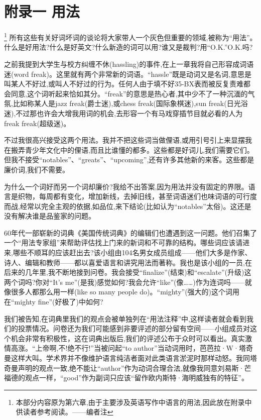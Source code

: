 \chapter{附录一 用法}\footnote{本部分内容原为第六章,由于主要涉及英语写作中语言的用法,因此放在附录中供读者参考阅读。——编者注}
所有这些有关好词坏词的谈论将大家带人一个灰色但重要的领域,被称为“用法”。什么是好用法?什么是好英文?什么新造的词可以用?谁又是裁判?用“O.K.”O.K.吗?

之前我提到大学生与校方纠缠不休(hassling)的事件,在上一章我将自己形容成词语迷(word freak)。这里就有两个非常新的词语。“hassle”既是动词又是名词,意思是叫某人不好过,或叫人不好过的行为。任何人由于填不好35-BX表而被反复责难都会同意,这个词听起来恰如其分。“freak”的意思是热心者,其中少不了一种沉湎的气氛,比如称某人是jazz freak(爵士迷),或chess freak(国际象棋迷),sun freak(日光浴迷),不过那也许会大增我用词的机会,去形容一个有马戏穿插节目就必看的人为freak freak(超级迷)。

不过我很高兴接受这两个用法。我并不把这些词当做俚语,或用引号引上来显摆我在搬弄青少年文化中的俚语,而且比谁懂的都多。这些都是好词儿,我们需要它们。但我不接受“notables”、“greats”、“upcoming”,还有许多其他新的来客。这些都是廉价词,我们不需要。

为什么一个词好而另一个词却廉价?我给不出答案,因为用法并没有固定的界限。语言是织物，每周都有变化，增加新线，去掉旧线，甚至词语迷们也味词语的可行度而战,经常以完全主观的依据,如品位,来下结论(比如认为“notables”太俗)。这还是没有解决谁是品鉴家的问题。

60年代一部崭新的词典《美国传统词典》的编辑们也遭遇到这一问题。他们召集了一个“用法专家组”来帮助评估找上门来的新词和不可靠的结构。哪些词应该请进来,哪些不顺耳的应该赶出去?该小组由104名男女成员组成——他们大多是作家、诗人、编辑和教师——都以喜爱语言和讲究用法而著称。我也是该小组的一员,在后来的几年里,我不断地接到问卷。我会接受“finalize”(结束)和“escalate”(升级)这两个词吗?你对“It’s me”(是我)感觉如何?我会允许“like”(像……)作为连词吗——就像很多人都那么用一样(like so many people do)。“mighty”(强大的)这个词用在“mighty fine”(好极了)中如何?

我们被告知,在词典里我们的观点会被单独列在“用法注释”中,这样读者就会看到我们的投票情况。问卷还为我们可能感到非要评述的部分留有空间——小组成员对这个机会非常有积极性，这在词典出版后,我们的评述公布于众时可以看出。真实激情高涨。“上帝啊,不!绝不行!”当被问起“to author”当动词用时，芭芭拉·W·塔奇曼这样大叫。学术界并不像维护语言纯洁者面对此类语言淤泥时那样动怒。我同塔奇曼声明的观点一致,绝不能让“author”作为动词合理合法,就像我同意刘易斯·芒福德的观点一样，“good”作为副词只应该“留作欧内斯特·海明威独有的特征”。

